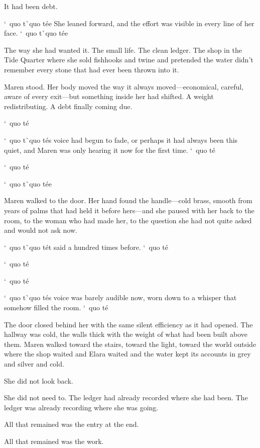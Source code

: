 \documentclass[12pt,letterpaper,openany]{book}
\begin{document}
\par
It had been debt.
\par
`\ quo t\`\ quo t\'e{}e{} She leaned forward, and the effort was visible in every line of her face. `\ quo t\`\ quo t\'e{}e{}
\par
The way she had wanted it. The small life. The clean ledger. The shop in the Tide Quarter where she sold fishhooks and twine and pretended the water didn't remember every stone that had ever been thrown into it.
\par
Maren stood. Her body moved the way it always moved—economical, careful, aware of every exit—but something inside her had shifted. A weight redistributing. A debt finally coming due.
\par
`\ quo t\'e{}
\par
`\ quo t\`\ quo t\'e{}s voice had begun to fade, or perhaps it had always been this quiet, and Maren was only hearing it now for the first time. `\ quo t\'e{}
\par
`\ quo t\'e{}
\par
`\ quo t\`\ quo t\'e{}e{}
\par
Maren walked to the door. Her hand found the handle—cold brass, smooth from years of palms that had held it before hers—and she paused with her back to the room, to the woman who had made her, to the question she had not quite asked and would not ask now.
\par
`\ quo t\`\ quo t\'e{}t said a hundred times before. `\ quo t\'e{}
\par
`\ quo t\'e{}
\par
`\ quo t\'e{}
\par
`\ quo t\`\ quo t\'e{}s voice was barely audible now, worn down to a whisper that somehow filled the room. `\ quo t\'e{}
\par
The door closed behind her with the same silent efficiency as it had opened. The hallway was cold, the walls thick with the weight of what had been built above them. Maren walked toward the stairs, toward the light, toward the world outside where the shop waited and Elara waited and the water kept its accounts in grey and silver and cold.
\par
She did not look back.
\par
She did not need to. The ledger had already recorded where she had been. The ledger was already recording where she was going.
\par
All that remained was the entry at the end.
\par
All that remained was the work.
\par
\end{document}
